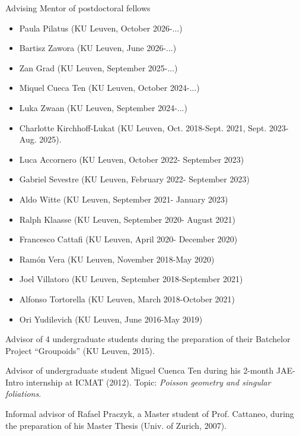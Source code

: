 \documentclass[12p]{resume}
\begin{document}
\begin{category}{Advising}
\citemnobullet Mentor of postdoctoral fellows
\begin{itemize}
\item Paula Pilatus (KU Leuven, October 2026-...)
\item Bartisz Zawora (KU Leuven, June 2026-...)
\item Zan Grad (KU Leuven, September 2025-...)
\item Miquel Cueca Ten (KU Leuven, October 2024-...)
\item Luka Zwaan (KU Leuven, September 2024-...)
\item Charlotte Kirchhoff-Lukat (KU Leuven, Oct. 2018-Sept. 2021, Sept. 2023- Aug. 2025).
\item Luca Accornero  (KU Leuven, October 2022- September 2023)
\item Gabriel Sevestre  (KU Leuven, February 2022- September 2023)
\item Aldo Witte  (KU Leuven, September 2021- January 2023)
\item Ralph Klaasse (KU Leuven, September 2020- August 2021)
\item Francesco Cattafi (KU Leuven, April 2020- December 2020)
\item Ram\'on Vera (KU Leuven, November 2018-May 2020)
\item Joel Villatoro (KU Leuven, September 2018-September 2021)
\item Alfonso Tortorella (KU Leuven, March 2018-October 2021)
\item Ori Yudilevich (KU Leuven, June 2016-May 2019)

\end{itemize}






\citemnobullet Advisor of 4 undergraduate students during the preparation of their Batchelor Project ``Groupoids'' (KU Leuven, 2015).

\citemnobullet Advisor of undergraduate student Miguel Cuenca Ten during his 2-month JAE-Intro internship at ICMAT (2012).
 Topic: 
\emph{Poisson geometry and singular foliations}. 

\citemnobullet
Informal advisor of Rafael Praczyk, a Master student of Prof. Cattaneo, during the preparation of his Master Thesis (Univ. of Zurich, 2007).
\end{category} 
\end{document}
